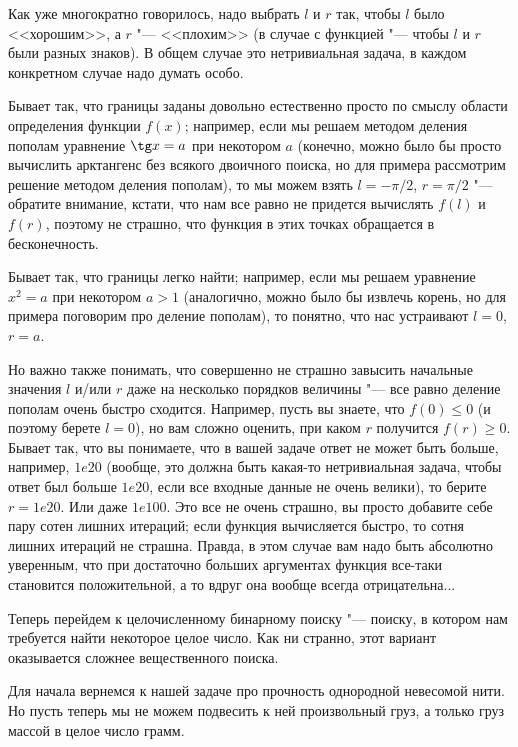 \documentclass[a4paper,10pt]{problems}
\begin{document}
 Как уже многократно говорилось, надо выбрать $l$ и $r$ так, чтобы $l$ было <<хорошим>>, а $r$ "--- <<плохим>>
(в случае с функцией "--- чтобы $l$ и $r$ были разных знаков). 
В общем случае это нетривиальная задача, в каждом конкретном случае надо думать особо.

Бывает так, что границы заданы довольно естественно просто по смыслу области определения функции $f(x)$;
например, если мы решаем методом деления пополам уравнение $\tg x=a$ при некотором $a$ 
(конечно, можно было бы просто вычислить арктангенс без всякого двоичного поиска, но для примера рассмотрим решение методом деления пополам), 
то мы можем взять $l=-\pi/2$, $r=\pi/2$ "--- обратите внимание, кстати, что нам все равно не придется вычислять $f(l)$ и $f(r)$, поэтому не страшно,
что функция в этих точках обращается в бесконечность.

Бывает так, что границы легко найти; например, если мы решаем уравнение $x^2=a$ при некотором $a>1$
(аналогично, можно было бы извлечь корень, но для примера поговорим про деление пополам), то понятно,
что нас устраивают $l=0$, $r=a$.

Но важно также понимать, что совершенно не страшно завысить начальные значения $l$ и/или $r$ даже на несколько порядков величины
"--- все равно деление пополам очень быстро сходится.
Например, пусть вы знаете, что $f(0)\leq 0$ (и поэтому берете $l=0$), но вам сложно оценить, при каком $r$ получится $f(r)\geq 0$.
Бывает так, что вы понимаете, что в вашей задаче ответ не может быть больше, например, $1e20$ (вообще, это должна быть
какая-то нетривиальная задача, чтобы ответ был больше $1e20$, если все входные данные не очень велики), то берите $r=1e20$.
Или даже $1e100$. 
Это все не очень страшно, вы просто добавите себе пару сотен лишних итераций; если функция вычисляется быстро, то сотня лишних итераций не страшна.
Правда, в этом случае вам надо быть абсолютно уверенным, что при достаточно больших аргументах функция все-таки становится положительной,
а то вдруг она вообще всегда отрицательна...

Теперь перейдем к целочисленному бинарному поиску "--- поиску, в котором нам требуется найти некоторое целое число. 
Как ни странно, этот вариант оказывается сложнее вещественного поиска.

 Для начала вернемся к нашей задаче про прочность однородной невесомой нити. 
Но пусть теперь мы не можем подвесить к ней произвольный груз, а только груз массой в целое число грамм.
\end{document}
